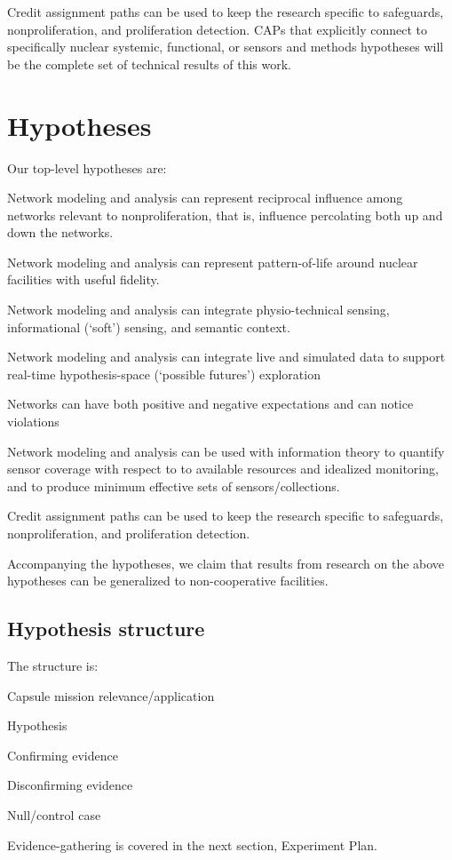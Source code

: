 \documentclass{article} %
\begin{document}
Credit assignment paths can be used to keep the research specific to safeguards, nonproliferation, and proliferation detection. CAPs that explicitly connect to specifically nuclear systemic, functional, or sensors and methods hypotheses will be the complete set of technical results of this work.

\newpage
\section{Hypotheses}
\noindent Our top-level hypotheses are:
\renewcommand\labelitemi{\tiny$\bullet$}
\begin{enumerate*}
\item Network modeling and analysis can represent reciprocal influence among networks relevant to nonproliferation, that is, influence percolating both up and down the networks.
\item Network modeling and analysis can represent pattern-of-life around nuclear facilities with useful fidelity.
\item Network modeling and analysis can integrate physio-technical sensing, informational (`soft') sensing, and semantic context.
\item Network modeling and analysis can integrate  live and simulated data to support real-time hypothesis-space (`possible futures') exploration
\item Networks can have both positive and negative expectations and can notice violations
\item Network modeling and analysis can be used with information theory to quantify sensor coverage with respect to to available resources and idealized monitoring, and to produce minimum effective sets of sensors/collections.
\item Credit assignment paths can be used to keep the research specific to safeguards, nonproliferation, and proliferation detection.
\end{enumerate*}

\noindent Accompanying the hypotheses, we claim that results from research on the above hypotheses can be generalized to non-cooperative facilities.

\subsection{Hypothesis structure}
The structure is:
\begin{itemize*}
\item Capsule mission relevance/application
\item Hypothesis
\item Confirming evidence
\item Disconfirming evidence
\item Null/control case
\end{itemize*}
Evidence-gathering is covered in the next section, Experiment Plan.
\end{document}
